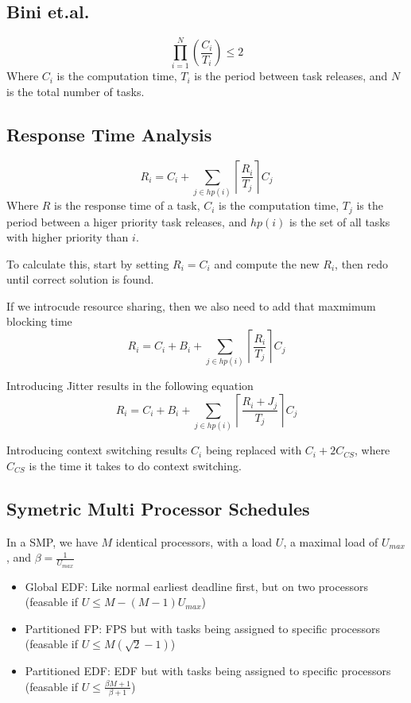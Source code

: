 \documentclass{article}
\begin{document}
		\subsection{Bini et.al.}
			\begin{equation}
				\prod^{N}_{i=1}\left(\frac{C_i}{T_i}\right)\leq2
			\end{equation}
			Where $C_i$ is the computation time, $T_i$ is the period between task releases, and $N$ is the total number of tasks.

		\subsection{Response Time Analysis}
			\begin{equation}
				R_i=C_i+\sum_{j\in hp(i)}\left\lceil{\frac{R_i}{T_j}}\right\rceil C_j
			\end{equation}
			Where $R$ is the response time of a task, $C_i$ is the computation time, $T_j$ is the period between a higer priority task releases, and $hp(i)$ is the set of all tasks with higher priority than $i$.

			To calculate this, start by setting $R_i=C_i$ and compute the new $R_i$, then redo until correct solution is found.

			If we introcude resource sharing, then we also need to add that maxmimum blocking time
			\begin{equation}
				R_i=C_i+B_i+\sum_{j\in hp(i)}\left\lceil{\frac{R_i}{T_j}}\right\rceil C_j
			\end{equation}

			Introducing Jitter results in the following equation
			\begin{equation}
				R_i=C_i+B_i+\sum_{j\in hp(i)}\left\lceil{\frac{R_i+J_j}{T_j}}\right\rceil C_j
			\end{equation}

			Introducing context switching results $C_i$ being replaced with $C_i+2C_{CS}$, where $C_{CS}$ is the time it takes to do context switching.

		\subsection{Symetric Multi Processor Schedules}
		In a SMP, we have $M$ identical processors, with a load $U$, a maximal load of $U_{max}$, and $\beta=\frac{1}{U_{max}}$
			\begin{itemize}
				\item Global EDF: Like normal earliest deadline first, but on two processors (feasable if $U\leq M-(M-1)U_{max}$)
				\item Partitioned FP: FPS but with tasks being assigned to specific processors (feasable if $U\leq M\left(\sqrt{2}-1\right)$)
				\item Partitioned EDF: EDF but with tasks being assigned to specific processors (feasable if $U\leq\frac{\beta M+1}{\beta+1}$)
			\end{itemize}
	
\end{document}
